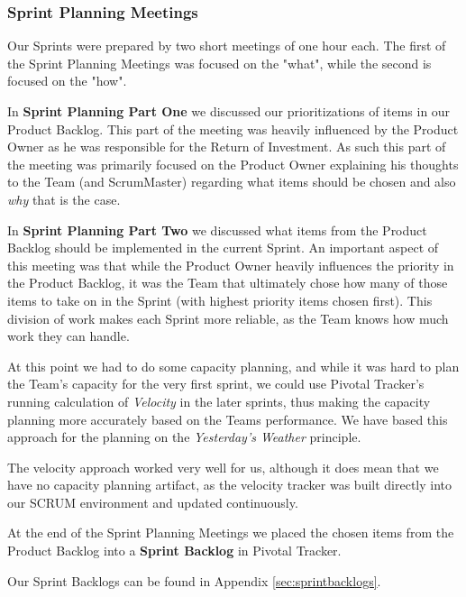 \subsubsection{Sprint Planning Meetings} 
Our Sprints were prepared by two short meetings of one hour each. The first of the Sprint Planning Meetings was focused on the "what", while the second is focused on the "how".

In \textbf{Sprint Planning Part One}  we discussed our prioritizations of items in our Product Backlog. This part of the meeting was heavily influenced by the Product Owner as he was responsible for the Return of Investment. As such this part of the meeting was primarily focused on the Product Owner explaining his thoughts to the Team (and ScrumMaster) regarding what items should be chosen and also \textit{why} that is the case.

In \textbf{Sprint Planning Part Two} we discussed what items from the Product Backlog should be implemented in the current Sprint. An important aspect of this meeting was that while the Product Owner heavily influences the priority in the Product Backlog, it was the Team that ultimately chose how many of those items to take on in the Sprint (with highest priority items chosen first). This division of work makes each Sprint more reliable, as the Team knows how much work they can handle.

At this point we had to do some capacity planning, and while it was hard to plan the Team's capacity for the very first sprint, we could use Pivotal Tracker's running calculation of \textit{Velocity} in the later sprints, thus making the capacity planning more accurately based on the Teams performance. We have based this approach for the planning on the \textit{Yesterday's Weather} principle\cite{fowleryesterday}.

The velocity approach worked very well for us, although it does mean that we have no capacity planning artifact, as the velocity tracker was built directly into our SCRUM environment and updated continuously.

At the end of the Sprint Planning Meetings we placed the chosen items from the Product Backlog into a \textbf{Sprint Backlog} in Pivotal Tracker.

Our Sprint Backlogs can be found in Appendix \ref{sec:sprintbacklogs}.

